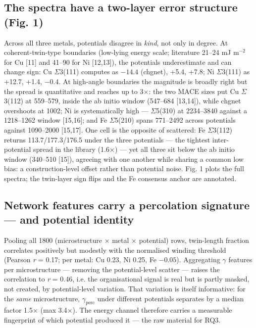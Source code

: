\documentclass[preprint,12pt]{elsarticle}
\begin{document}
\subsection{The spectra have a two-layer error structure (Fig. 1)}

Across all three metals, potentials disagree in \textit{kind}, not only in degree. At coherent-twin-type boundaries (low-lying energy scale; literature 21--24 mJ m$^{-2}$ for Cu [11] and 41--90 for Ni [12,13]), the potentials underestimate and can change sign: Cu $\Sigma$3(111) computes as $-14.4$ (chgnet), +5.4, +7.8; Ni $\Sigma$3(111) as +12.7, +1.4, $-0.4$. At high-angle boundaries the magnitude is broadly right but the spread is quantitative and reaches up to 3$\times$: the two MACE sizes put Cu $\Sigma$3(112) at 559--579, inside the ab initio window (547--684 [13,14]), while chgnet overshoots at 1002; Ni is systematically high --- $\Sigma$5(310) at 2234--3840 against a 1218--1262 window [15,16]; and Fe $\Sigma$5(210) spans 771--2492 across potentials against 1090--2000 [15,17]. One cell is the opposite of scattered: Fe $\Sigma$3(112) returns 113.7/177.3/176.5 under the three potentials --- the tightest inter-potential spread in the library (1.6$\times$) --- yet all three sit below the ab initio window (340--510 [15]), agreeing with one another while sharing a common low bias: a construction-level offset rather than potential noise. Fig. 1 plots the full spectra; the twin-layer sign flips and the Fe consensus anchor are annotated.

\subsection{Network features carry a percolation signature --- and potential identity}

Pooling all 1800 (microstructure $\times$ metal $\times$ potential) rows, twin-length fraction correlates positively but modestly with the normalised winding threshold (Pearson \textit{r} = 0.17; per metal: Cu 0.23, Ni 0.25, Fe $-0.05$). Aggregating $\gamma$ features per microstructure --- removing the potential-level scatter --- raises the correlation to \textit{r} = 0.46, i.e. the organisational signal is real but is partly masked, not created, by potential-level variation. That variation is itself informative: for the \textit{same} microstructure, $\gamma_{\mathrm{perc}}$ under different potentials separates by a median factor 1.5$\times$ (max 3.4$\times$). The energy channel therefore carries a measurable fingerprint of which potential produced it --- the raw material for RQ3.
\end{document}
